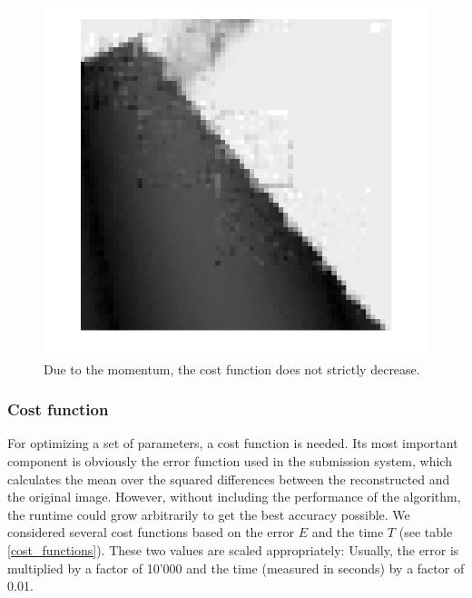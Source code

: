 \documentclass[10pt,conference,compsocconf]{IEEEtran}
\begin{document}
\begin{figure}
\centering
\includegraphics[width=\columnwidth]{images/framing_artifacts.png}
\caption{Due to the momentum, the cost function does not strictly decrease.}
\label{gradient_descent_figure}
\end{figure}

\subsubsection{Cost function}
For optimizing a set of parameters, a cost function is needed. Its most important component is obviously the error function used in the submission system, which calculates the mean over the squared differences between the reconstructed and the original image. However, without including the performance of the algorithm, the runtime could grow arbitrarily to get the best accuracy possible. We considered several cost functions based on the error $E$ and the time $T$ (see table \ref{cost_functions}). These two values are scaled appropriately: Usually, the error is multiplied by a factor of 10'000 and the time (measured in seconds) by a factor of 0.01.
\end{document}

